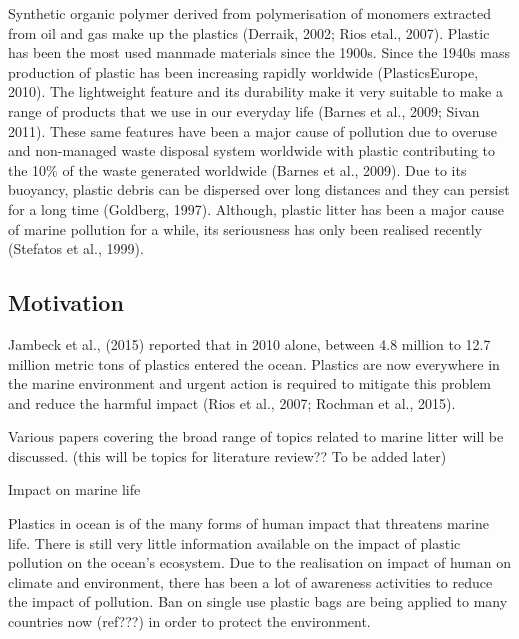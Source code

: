 \documentclass[10pt]{article}\usepackage[]{graphicx}\usepackage[]{color}
\begin{document}
Synthetic organic polymer derived from polymerisation of monomers extracted from oil and gas make up the plastics (Derraik, 2002; Rios etal., 2007). Plastic has been the most used manmade materials since the 1900s. Since the 1940s mass production of plastic has been increasing rapidly worldwide (PlasticsEurope, 2010). The lightweight feature and its durability make it very suitable to make a range of products that we use in our everyday life (Barnes et al., 2009; Sivan 2011). These same features have been a major cause of pollution due to overuse and non-managed waste disposal system worldwide with plastic contributing to the 10\% of the waste generated worldwide (Barnes et al., 2009). Due to its buoyancy, plastic debris can be dispersed over long distances and they can persist for a long time (Goldberg, 1997). Although, plastic litter has been a major cause of marine pollution for a while, its seriousness has only been realised recently (Stefatos et al., 1999). 


\subsection{Motivation}\label{mot}
Jambeck et al., (2015) reported that in 2010 alone, between 4.8 million to 12.7 million metric tons of plastics entered the ocean. Plastics are now everywhere in the marine environment and urgent action is required to mitigate this problem and reduce the harmful impact (Rios et al., 2007; Rochman et al., 2015). 

Various papers covering the broad range of topics related to marine litter will be discussed. (this will be topics for literature review?? To be added later)

Impact on marine life

Plastics in ocean is of the many forms of human impact that threatens marine life. There is still very little information available on the impact of plastic pollution on the ocean's ecosystem. Due to the realisation on impact of human on climate and environment, there has been a lot of awareness activities to reduce the impact of pollution. Ban on single use plastic bags are being applied to many countries now (ref???) in order to protect the environment. 
\end{document}
